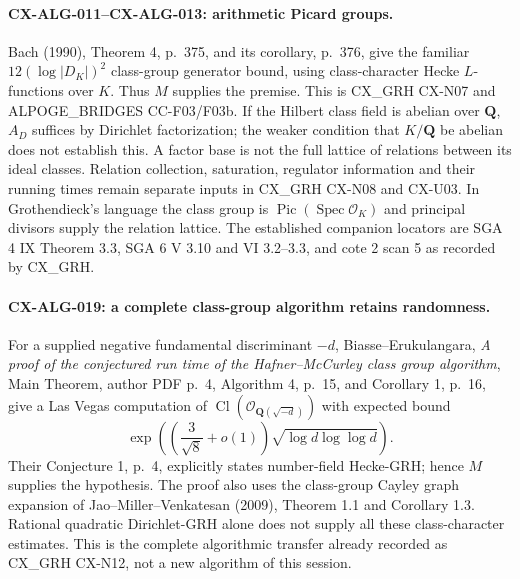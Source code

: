 \paragraph{CX-ALG-011--CX-ALG-013: arithmetic Picard groups.}
Bach (1990), Theorem 4, p.~375, and its corollary, p.~376, give the familiar
$12(\log|D_K|)^2$ class-group generator bound, using class-character Hecke
$L$-functions over $K$. Thus $M$ supplies the premise. This is CX\_GRH
CX-N07 and ALPOGE\_BRIDGES CC-F03/F03b. If the Hilbert class field is
abelian over $\mathbf Q$, $A_D$ suffices by Dirichlet factorization; the
weaker condition that $K/\mathbf Q$ be abelian does not establish this.
A factor base is not the full lattice of relations between its ideal
classes. Relation collection, saturation, regulator information and their
running times remain separate inputs in CX\_GRH CX-N08 and CX-U03.
In Grothendieck's language the class group is
$\operatorname{Pic}(\operatorname{Spec}\mathcal O_K)$ and principal divisors
supply the relation lattice. The established companion locators are SGA 4
IX Theorem 3.3, SGA 6 V 3.10 and VI 3.2--3.3, and cote 2 scan 5 as recorded
by CX\_GRH.

\paragraph{CX-ALG-019: a complete class-group algorithm retains randomness.}
For a supplied negative fundamental discriminant $-d$, Biasse--Erukulangara,
\emph{A proof of the conjectured run time of the Hafner--McCurley class
group algorithm}, Main Theorem, author PDF p.~4, Algorithm 4, p.~15,
and Corollary 1, p.~16, give a Las Vegas computation of
$\operatorname{Cl}(\mathcal O_{\mathbf Q(\sqrt{-d})})$ with expected bound
\[
 \exp\!\left(\left(\frac3{\sqrt8}+o(1)\right)
                         \sqrt{\log d\log\log d}\right).
\]
Their Conjecture 1, p.~4, explicitly states number-field Hecke-GRH; hence
$M$ supplies the hypothesis. The proof also uses the class-group Cayley
graph expansion of Jao--Miller--Venkatesan (2009), Theorem 1.1 and
Corollary 1.3. Rational quadratic Dirichlet-GRH alone does not supply all
these class-character estimates. This is the complete algorithmic transfer
already recorded as CX\_GRH CX-N12, not a new algorithm of this session.


